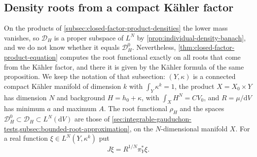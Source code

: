 \subsection{Density roots from a compact K\"ahler factor}
\label{subsec:closed-factor-root-spaces}

On the products of \cref{subsec:closed-factor-product-densities} the lower mass vanishes, so $\mathcal D_H$ is a proper subspace of $L^N$ by \cref{prop:individual-density-banach}, and we do not know whether it equals $\mathcal D_H^0$. Nevertheless, \cref{thm:closed-factor-product-equation} computes the root functional exactly on all roots that come from the K\"ahler factor, and there it is given by the K\"ahler formula of the same proposition. We keep the notation of that subsection: $(Y,\kappa)$ is a connected compact K\"ahler manifold of dimension $k$ with $\int_Y\kappa^k=1$, the product $X=X_0\times Y$ has dimension $N$ and background $H=h_0+\kappa$, with $\int_XH^N=CV_0$, and $R=\mu/\mathrm{d}V$ has minimum $a$ and maximum $A$. The root functional $\rho_H$ and the spaces $\mathcal D_H^0\subset\mathcal D_H\subset L^N(\mathrm{d}V)$ are those of \cref{sec:integrable-gauduchon-tests,subsec:bounded-root-approximation}, on the $N$-dimensional manifold $X$. For a real function $\xi\in L^N(Y,\kappa^k)$ put
\[
 J\xi=R^{1/N}\pi_Y^*\xi.
\]

